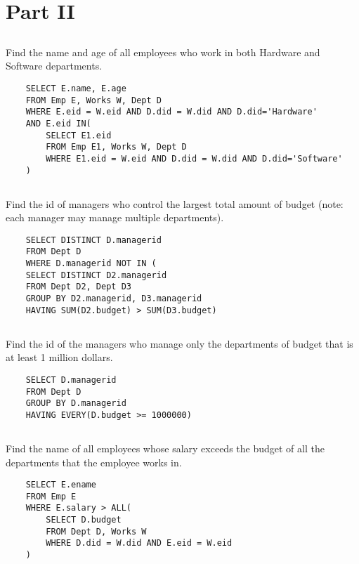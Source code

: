 \documentclass{article}
\begin{document}
\section{Part II}
\subsection{}
Find the name and age of all employees who work in both Hardware and Software departments.
\begin{verbatim}
    SELECT E.name, E.age
    FROM Emp E, Works W, Dept D
    WHERE E.eid = W.eid AND D.did = W.did AND D.did='Hardware'
    AND E.eid IN(   
        SELECT E1.eid
        FROM Emp E1, Works W, Dept D
        WHERE E1.eid = W.eid AND D.did = W.did AND D.did='Software'
    )
\end{verbatim}

\subsection{}
Find the id of managers who control the largest total amount of budget (note: each manager may manage multiple departments).
\begin{verbatim}
    SELECT DISTINCT D.managerid
    FROM Dept D
    WHERE D.managerid NOT IN (
    SELECT DISTINCT D2.managerid
    FROM Dept D2, Dept D3
    GROUP BY D2.managerid, D3.managerid
    HAVING SUM(D2.budget) > SUM(D3.budget)
\end{verbatim}

\subsection{}
Find the id of the managers who manage only the departments of budget that is at least 1 million dollars.
\begin{verbatim}
    SELECT D.managerid
    FROM Dept D
    GROUP BY D.managerid 
    HAVING EVERY(D.budget >= 1000000)
\end{verbatim}

\subsection{}
Find the name of all employees whose salary exceeds the budget of all the departments that the employee works in.
\begin{verbatim}
    SELECT E.ename
    FROM Emp E
    WHERE E.salary > ALL(
        SELECT D.budget 
        FROM Dept D, Works W 
        WHERE D.did = W.did AND E.eid = W.eid
    )
\end{verbatim}
\end{document}
